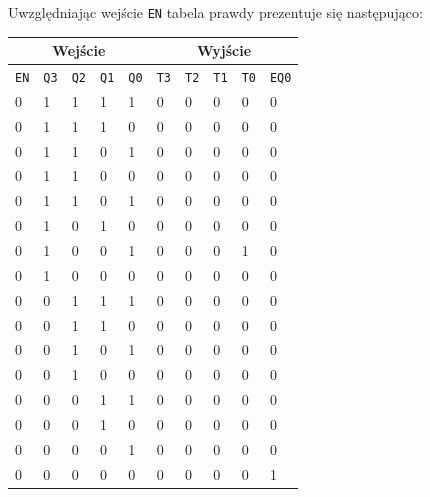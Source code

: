 \documentclass[a4paper]{article}
\begin{document}
    \pagebreak
    Uwzględniając wejście \verb|EN| tabela prawdy prezentuje się następująco:
        \begin{center}
            \begin{tabular}{|l|l|l|l|l||l|l|l|l|l|}
            \hline
            \multicolumn{5}{|c||}{Wejście} & \multicolumn{5}{|c|}{Wyjście} \\\hline
            \verb|EN| &\verb|Q3| & \verb|Q2| & \verb|Q1| & \verb|Q0| & \verb|T3| & \verb|T2| & \verb|T1| & \verb|T0| & \verb|EQ0| \\ \hline
            0 & 1 & 1 & 1 & 1 & 0 & 0 & 0 & 0 & 0 \\ \hline
            0 & 1 & 1 & 1 & 0 & 0 & 0 & 0 & 0 & 0 \\ \hline
            0 & 1 & 1 & 0 & 1 & 0 & 0 & 0 & 0 & 0 \\ \hline
            0 & 1 & 1 & 0 & 0 & 0 & 0 & 0 & 0 & 0 \\ \hline
            0 & 1 & 1 & 0 & 1 & 0 & 0 & 0 & 0 & 0 \\ \hline
            0 & 1 & 0 & 1 & 0 & 0 & 0 & 0 & 0 & 0 \\ \hline
            0 & 1 & 0 & 0 & 1 & 0 & 0 & 0 & 1 & 0 \\ \hline
            0 & 1 & 0 & 0 & 0 & 0 & 0 & 0 & 0 & 0 \\ \hline
            0 & 0 & 1 & 1 & 1 & 0 & 0 & 0 & 0 & 0 \\ \hline
            0 & 0 & 1 & 1 & 0 & 0 & 0 & 0 & 0 & 0 \\ \hline
            0 & 0 & 1 & 0 & 1 & 0 & 0 & 0 & 0 & 0 \\ \hline
            0 & 0 & 1 & 0 & 0 & 0 & 0 & 0 & 0 & 0 \\ \hline
            0 & 0 & 0 & 1 & 1 & 0 & 0 & 0 & 0 & 0 \\ \hline
            0 & 0 & 0 & 1 & 0 & 0 & 0 & 0 & 0 & 0 \\ \hline
            0 & 0 & 0 & 0 & 1 & 0 & 0 & 0 & 0 & 0 \\ \hline
            0 & 0 & 0 & 0 & 0 & 0 & 0 & 0 & 0 & 1 \\ \hline
            

\end{tabular}
\end{center}
\end{document}

